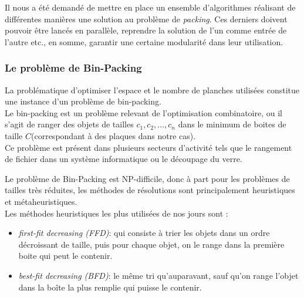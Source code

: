 Il nous a été demandé de mettre en place un ensemble d'algorithmes réalisant de différentes manières une solution au problème de \textit{packing}. Ces derniers doivent pouvoir être lancés en parallèle, reprendre la solution de l'un comme entrée de l'autre etc., en somme, garantir une certaine modularité dans leur utilisation.






\subsubsection{Le problème de Bin-Packing}
La problématique d'optimiser l'espace et le nombre de planches utilisées constitue une instance d'un problème de bin-packing.\\

Le bin-packing est un problème relevant de l'optimisation combinatoire, ou il s'agit de ranger des objets de tailles $c_{1}, c_{2}, ... , c_{n}$ dans le minimum de boites de taille $C$(correspondant à des plaques dans notre cas).\\

Ce problème est présent dans plusieurs secteurs d'activité tels que le rangement de fichier dans un système informatique ou le découpage du verre.

Le problème de Bin-Packing est NP-difficile, donc à part pour les problèmes de tailles très réduites, les méthodes de résolutions sont principalement heuristiques et métaheuristiques.\\

Les méthodes heuristiques les plus utilisées de nos jours sont :  
\begin{itemize}
    \item \textit{first-fit decreasing (FFD)}: qui consiste à trier les objets dans un ordre décroissant de taille, puis pour chaque objet, on le range dans la première boite qui peut le contenir. 
    \item \textit{best-fit decreasing (BFD)}: le même tri qu'auparavant, sauf qu'on range l'objet dans la boîte la plus remplie qui puisse le contenir.
\end{itemize}
~\\


